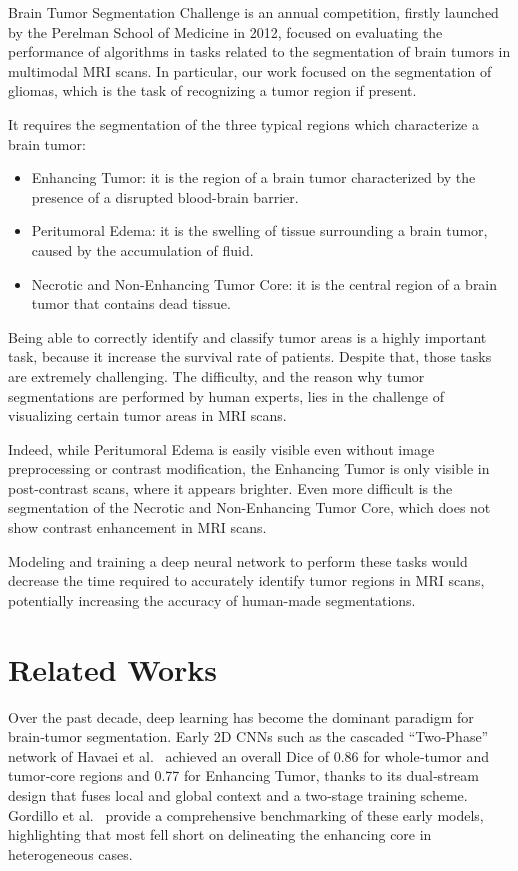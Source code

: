 \documentclass[10pt,twocolumn,letterpaper]{article}
\begin{document}
Brain Tumor Segmentation Challenge is an annual competition, firstly launched by the Perelman School of Medicine\cite{BraTSChallenge} in 2012, focused on evaluating the performance of algorithms in tasks related to the segmentation of brain tumors in multimodal MRI scans. In particular, our work focused on the segmentation of gliomas, which is the task of recognizing a tumor region if present.

It requires the segmentation of the three typical regions which characterize a brain tumor:
    \begin{itemize}
        \item Enhancing Tumor: it is the region of a brain tumor characterized by the presence of a disrupted blood-brain barrier.
        \item Peritumoral Edema: it is the swelling of tissue surrounding a brain tumor, caused by the accumulation of fluid.
        \item Necrotic and Non-Enhancing Tumor Core: it is the central region of a brain tumor that contains dead tissue.
\end{itemize}

Being able to correctly identify and classify tumor areas is a highly important task, because it increase the survival rate of patients. Despite that, those tasks are extremely challenging. The difficulty, and the reason why tumor segmentations are performed by human experts, lies in the challenge of visualizing certain tumor areas in MRI scans.

Indeed, while Peritumoral Edema is easily visible even without image preprocessing or contrast modification, the Enhancing Tumor is only visible in post-contrast scans, where it appears brighter. Even more difficult is the segmentation of the Necrotic and Non-Enhancing Tumor Core, which does not show contrast enhancement in MRI scans.

Modeling and training a deep neural network to perform these tasks would decrease the time required to accurately identify tumor regions in MRI scans, potentially increasing the accuracy of human-made segmentations.

\section{Related Works}

Over the past decade, deep learning has become the dominant paradigm for brain‐tumor segmentation. Early 2D CNNs such as the cascaded “Two‐Phase” network of Havaei et al.~\cite{HAVAEI201718} achieved an overall Dice of 0.86 for whole‐tumor and tumor‐core regions and 0.77 for Enhancing Tumor, thanks to its dual‐stream design that fuses local and global context and a two‐stage training scheme. Gordillo et al.~\cite{GORDILLO20131426} provide a comprehensive benchmarking of these early models, highlighting that most fell short on delineating the enhancing core in heterogeneous cases.
\end{document}
